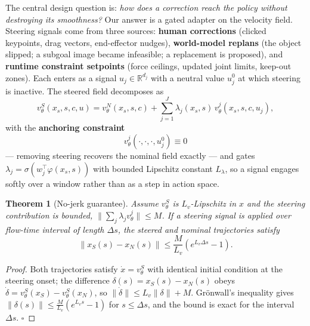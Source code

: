 \documentclass[11pt,a4paper]{article}
\newtheorem{theorem}{Theorem}
\begin{document}
The central design question is: \emph{how does a correction reach the policy
without destroying its smoothness?} Our answer is a gated adapter on the velocity
field. Steering signals come from three sources: \textbf{human corrections}
(clicked keypoints, drag vectors, end-effector nudges), \textbf{world-model
replans} (the object slipped; a subgoal image became infeasible; a replacement is
proposed), and \textbf{runtime constraint setpoints} (force ceilings, updated
joint limits, keep-out zones). Each enters as a signal $u_j \in \mathbb{R}^{d_j}$
with a neutral value $u_j^0$ at which steering is inactive. The steered field
decomposes as
\begin{equation}
v_\theta^{S}(x_s, s, c, u) = v_\theta^{N}(x_s, s, c)
+ \sum_{j=1}^{J} \lambda_j(x_s, s)\, v_\theta^{j}(x_s, s, c, u_j),
\label{eq:smc}
\end{equation}
with the \textbf{anchoring constraint}
\begin{equation}
v_\theta^{j}(\cdot, \cdot, \cdot, u_j^0) \equiv 0
\label{eq:anchor}
\end{equation}
--- removing steering recovers the nominal field exactly --- and gates
$\lambda_j = \sigma(w_j^\top \varphi(x_s, s))$ with bounded Lipschitz constant
$L_\lambda$, so a signal engages softly over a window rather than as a step in
action space.

\begin{theorem}[No-jerk guarantee]
\label{thm:gronwall}
Assume $v_\theta^{S}$ is $L_v$-Lipschitz in $x$ and the steering contribution is
bounded, $\| \sum_j \lambda_j v_\theta^{j} \| \le M$. If a steering signal is
applied over flow-time interval of length $\Delta s$, the steered and nominal
trajectories satisfy
\begin{equation}
\left\| x_S(s) - x_N(s) \right\| \le \frac{M}{L_v}
\left( e^{L_v \Delta s} - 1 \right).
\label{eq:bound}
\end{equation}
\end{theorem}

\begin{proof}
Both trajectories satisfy $\dot x = v_\theta^S$ with identical initial condition
at the steering onset; the difference $\delta(s) = x_S(s) - x_N(s)$ obeys
$\dot\delta = v_\theta^S(x_S) - v_\theta^S(x_N)$, so $\|\dot\delta\| \le
L_v \|\delta\| + M$. Gr\"onwall's inequality
\cite{coddington} gives
$\|\delta(s)\| \le \frac{M}{L_v}(e^{L_v s} - 1)$ for $s \le \Delta s$, and the
bound is exact for the interval $\Delta s$. \hfill$\square$
\end{proof}
\end{document}
